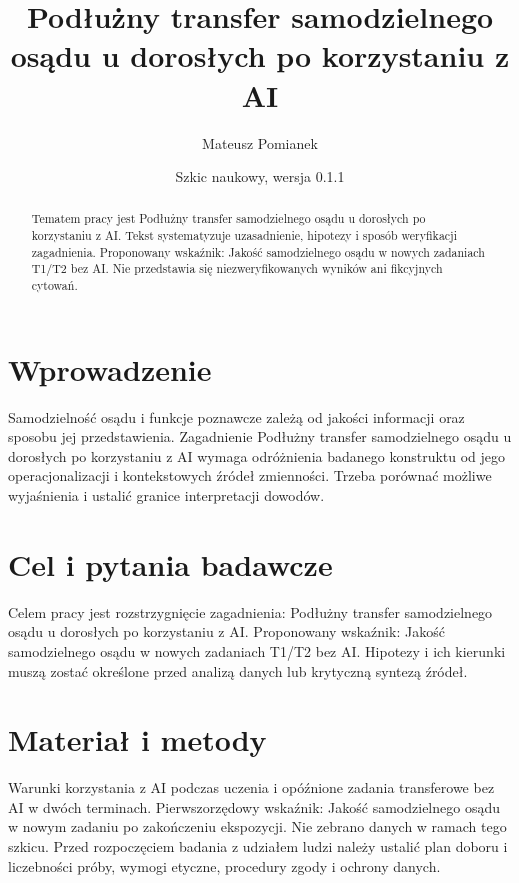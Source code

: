 \documentclass[11pt,a4paper]{article}
\title{Podłużny transfer samodzielnego osądu u dorosłych po korzystaniu z AI}
\author{Mateusz Pomianek}
\date{Szkic naukowy, wersja 0.1.1}
\begin{document}
\maketitle

\begin{abstract}

Tematem pracy jest Podłużny transfer samodzielnego osądu u dorosłych po korzystaniu z AI. Tekst systematyzuje uzasadnienie, hipotezy i sposób weryfikacji zagadnienia. Proponowany wskaźnik: Jakość samodzielnego osądu w nowych zadaniach T1/T2 bez AI. Nie przedstawia się niezweryfikowanych wyników ani fikcyjnych cytowań.

\end{abstract}

\section{Wprowadzenie}

Samodzielność osądu i funkcje poznawcze zależą od jakości informacji oraz sposobu jej przedstawienia. Zagadnienie Podłużny transfer samodzielnego osądu u dorosłych po korzystaniu z AI wymaga odróżnienia badanego konstruktu od jego operacjonalizacji i kontekstowych źródeł zmienności. Trzeba porównać możliwe wyjaśnienia i ustalić granice interpretacji dowodów.

\section{Cel i pytania badawcze}

Celem pracy jest rozstrzygnięcie zagadnienia: Podłużny transfer samodzielnego osądu u dorosłych po korzystaniu z AI. Proponowany wskaźnik: Jakość samodzielnego osądu w nowych zadaniach T1/T2 bez AI. Hipotezy i ich kierunki muszą zostać określone przed analizą danych lub krytyczną syntezą źródeł.

\section{Materiał i metody}

Warunki korzystania z AI podczas uczenia i opóźnione zadania transferowe bez AI w dwóch terminach. Pierwszorzędowy wskaźnik: Jakość samodzielnego osądu w nowym zadaniu po zakończeniu ekspozycji. Nie zebrano danych w ramach tego szkicu. Przed rozpoczęciem badania z udziałem ludzi należy ustalić plan doboru i liczebności próby, wymogi etyczne, procedury zgody i ochrony danych.
\end{document}
